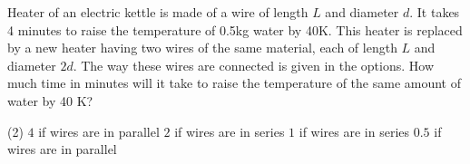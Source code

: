 
\item Heater of an electric kettle is made of a wire of length \(L\) and diameter \(d\). It takes 4 minutes to raise the temperature of 0.5kg water by 40K. This heater is replaced by a new heater having two wires of the same material, each of length \(L\) and diameter \(2d\). The way these wires are connected is given in the options. How much time in minutes will it take to raise the temperature of the same amount of water by 40 K?
    \begin{tasks}(2)
        \task \(4\) if wires are in parallel
        \task \(2\) if wires are in series
        \task \(1\) if wires are in series
        \task \(0.5\) if wires are in parallel
    \end{tasks}
